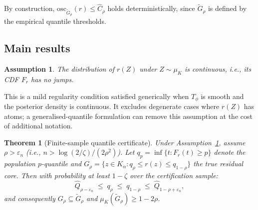 \documentclass[12pt]{article}
\newtheorem{theorem}{Theorem}
\newtheorem{assumption}{Assumption}
\newcommand{\osc}{\mathrm{osc}}
\begin{document}
By construction, $\osc_{\tilde{G}_\rho}(r) \le \hat{C}_\rho$ holds deterministically, since $\tilde{G}_\rho$ is defined by the empirical quantile thresholds.

\subsection{Main results}

\begin{assumption}\label{asm:continuous}
The distribution of $r(Z)$ under $Z \sim \mu_K$ is continuous, i.e., its CDF $F_r$ has no jumps.
\end{assumption}

This is a mild regularity condition satisfied generically when $T_\phi$ is smooth and the posterior density is continuous. It excludes degenerate cases where $r(Z)$ has atoms; a generalised-quantile formulation can remove this assumption at the cost of additional notation.

\begin{theorem}[Finite-sample quantile certificate]\label{thm:quantile}
Under Assumption~\ref{asm:continuous}, assume $\rho > \varepsilon_n$ (i.e., $n > \log(2/\zeta)/(2\rho^2)$).
Let $q_p = \inf\{t : F_r(t) \ge p\}$ denote the population $p$-quantile and $G_\rho = \{z \in K_\alpha : q_\rho \le r(z) \le q_{1-\rho}\}$ the true residual core.
Then with probability at least $1-\zeta$ over the certification sample:
\begin{equation}\label{eq:quantile-sandwich}
  \hat{Q}_{\rho - \varepsilon_n} \;\le\; q_\rho \;\le\; q_{1-\rho} \;\le\; \hat{Q}_{1-\rho+\varepsilon_n},
\end{equation}
and consequently $G_\rho \subseteq \tilde{G}_\rho$ and $\mu_K(\tilde{G}_\rho) \ge 1 - 2\rho$.
\end{theorem}
\end{document}
